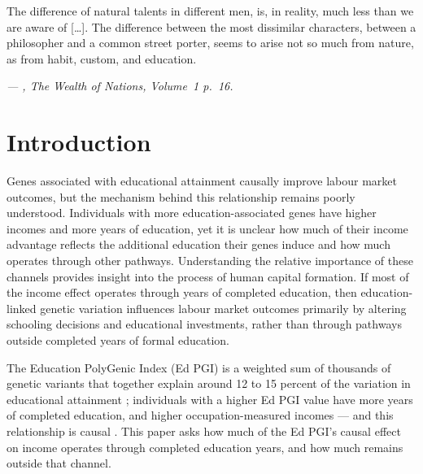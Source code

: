 \setlength{\epigraphwidth}{0.85\textwidth}
\vspace{-1cm}
{\singlespacing
\vspace{-1cm}
\epigraph{
    \justify
    The difference of natural talents in different men, is, in reality, much less than we are aware of [\ldots].
    The difference between the most dissimilar characters, between a philosopher and a common street porter, seems to arise not so much from nature, as from habit, custom, and education.
}{\textit{--- \citet{smith1937wealth},
    The Wealth of Nations, Volume~1 p.~16.}}}


\section{Introduction}
\label{sec:intro}
Genes associated with educational attainment causally improve labour market outcomes, but the mechanism behind this relationship remains poorly understood.
Individuals with more education-associated genes have higher incomes and more years of education, yet it is unclear how much of their income advantage reflects the additional education their genes induce and how much operates through other pathways.
Understanding the relative importance of these channels provides insight into the process of human capital formation.
If most of the income effect operates through years of completed education, then education-linked genetic variation influences labour market outcomes primarily by altering schooling decisions and educational investments, rather than through pathways outside completed years of formal education.

The Education PolyGenic Index (Ed PGI) is a weighted sum of thousands of genetic variants that together explain around 12 to 15 percent of the variation in educational attainment \citep{okbay2022polygenic}; individuals with a higher Ed PGI value have more years of completed education, and higher occupation-measured incomes --- and this relationship is causal \citep{carvalho2024genetics}.
This paper asks how much of the Ed PGI's causal effect on income operates through completed education years, and how much remains outside that channel.

